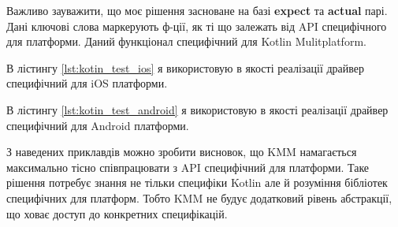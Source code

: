 Важливо зауважити, що моє рішення засноване на базі \textbf{expect} та \textbf{actual} парі.
Дані ключові слова маркерують ф-ції, як ті що залежать від API специфічного для платформи.
Даний функціонал специфічний для Kotlin Mulitplatform.

В лістингу \ref{lst:kotin_test_ios} я використовую в якості реалізації драйвер специфічний для iOS платформи.

В лістингу \ref{lst:kotin_test_android} я використовую в якості реалізації драйвер специфічний для Android платформи.

З наведених приклавдів можно зробити висновок, що KMM намагається максимально тісно співпрацювати з API специфічний для платформи.
Таке рішення потребує знання не тільки специфіки Kotlin але й розуміння бібліотек специфічних для платформ.
Тобто KMM не будує додатковий рівень абстракції, що ховає доступ до конкретних специфікацій.
